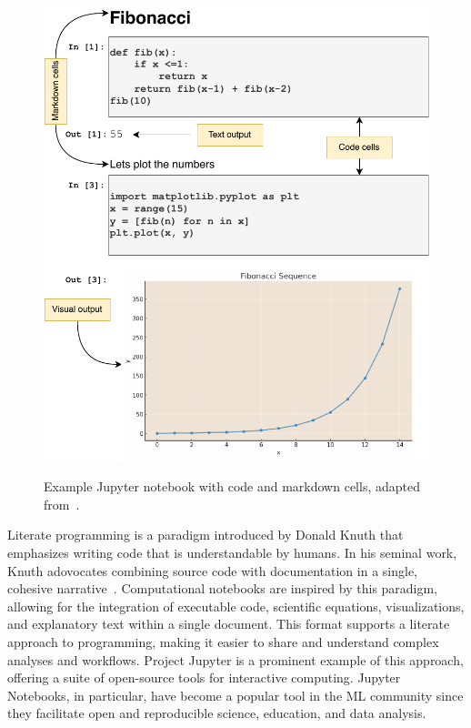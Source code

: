 

\begin{figure}
  \centering
  \includegraphics[width=0.75\linewidth]{nb.pdf}
  \label{fig:nb}
  \caption{Example Jupyter notebook with code and markdown cells, adapted from~\cite[Figure~1]{pimentel2019large-scale}.}
\end{figure}

Literate programming is a paradigm introduced by Donald Knuth that emphasizes writing code that is understandable by humans. In his seminal work, Knuth adovocates combining source code with documentation in a single, cohesive narrative~\cite{knuth1984literate}. Computational notebooks are inspired by this paradigm, allowing for the integration of executable code, scientific equations, visualizations, and explanatory text within a single document. This format supports a literate approach to programming, making it easier to share and understand complex analyses and workflows. Project Jupyter is a prominent example of this approach, offering a suite of open-source tools for interactive computing. Jupyter Notebooks, in particular, have become a popular tool in the ML community since they facilitate open and reproducible science, education, and data analysis.

